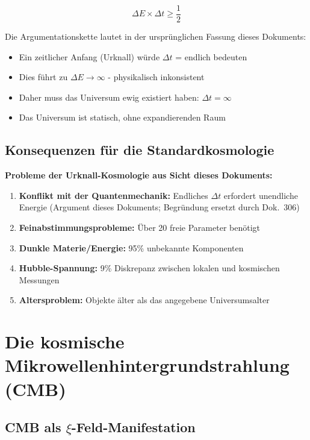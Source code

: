 	\begin{equation}
		\Delta E \times \Delta t \geq \frac{1}{2}
	\end{equation}
	
	Die Argumentationskette lautet in der ursprünglichen Fassung dieses Dokuments:
	
	\begin{itemize}
		\item Ein zeitlicher Anfang (Urknall) würde $\Delta t$ = endlich bedeuten
		\item Dies führt zu $\Delta E \to \infty$ - physikalisch inkonsistent
		\item Daher muss das Universum ewig existiert haben: $\Delta t = \infty$
		\item Das Universum ist statisch, ohne expandierenden Raum
	\end{itemize}
	
	\subsection{Konsequenzen für die Standardkosmologie}
	
	\begin{warning}
		\textbf{Probleme der Urknall-Kosmologie aus Sicht dieses Dokuments:}
		
		\begin{enumerate}
			\item \textbf{Konflikt mit der Quantenmechanik:} Endliches $\Delta t$ erfordert unendliche Energie (Argument dieses Dokuments; Begründung ersetzt durch Dok.~306)
			\item \textbf{Feinabstimmungsprobleme:} Über 20 freie Parameter benötigt
			\item \textbf{Dunkle Materie/Energie:} 95\% unbekannte Komponenten
			\item \textbf{Hubble-Spannung:} 9\% Diskrepanz zwischen lokalen und kosmischen Messungen
			\item \textbf{Altersproblem:} Objekte älter als das angegebene Universumsalter
		\end{enumerate}
	\end{warning}
	
	\section{Die kosmische Mikrowellenhintergrundstrahlung (CMB)}
	
	\subsection{CMB als $\xi$-Feld-Manifestation}
	
